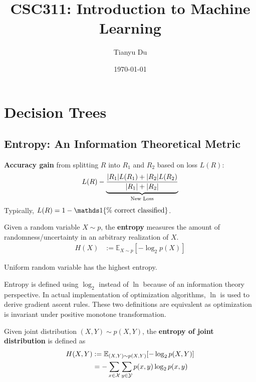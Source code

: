 \documentclass{article}
\title{CSC311: Introduction to Machine Learning}
\date{\today}
\author{Tianyu Du}
\begin{document}
	\maketitle
	\tableofcontents
	\newpage
	
	\section{Decision Trees}
	\subsection{Entropy: An Information Theoretical Metric}
	\begin{definition}
		\textbf{Accuracy gain} from splitting $R$ into $R_1$ and $R_2$ based on loss $L(R)$:
		\begin{align}
			L(R) - \underbrace{\frac{|R_1|L(R_1) + |R_2|L(R_2)}{|R_1| + |R_2|}}_{\text{{New Loss}}}
		\end{align}
		Typically, $L(R) = 1 - \id{\tx{\% correct classified}}$.
	\end{definition}
	
	\begin{definition}
		Given a random variable $X \sim p$, the \textbf{entropy} measures the amount of randomness/uncertainty in an arbitrary realization of $X$. 
		\begin{align}
			H(X) &:= \mathbb{E}_{X \sim p}[- \log_2 p(X)]
		\end{align}
	\end{definition}
	
	\begin{proposition}
		Uniform random variable has the highest entropy.
	\end{proposition}
	
	\begin{remark}
		Entropy is defined using $\log_2$ instead of $\ln$ because of an information theory perspective. In actual implementation of optimization algorithms, $\ln$ is used to derive gradient ascent rules. These two definitions are equivalent as optimization is invariant under positive monotone transformation.
	\end{remark}
	
	\begin{definition}
		Given joint distribution $(X, Y) \sim p(X, Y)$, the \textbf{entropy of joint distribution} is defined as
		\begin{align}
			H(X, Y) &:= \mathbb{E}_{(X, Y) \sim p(X, Y)} [
			- \log_2 p(X, Y)
			] \\
			&= - \sum_{x \in \mathcal{{X}}} \sum_{y \in \mathcal{{Y}}} p(x, y) \log_2 p(x, y)
		\end{align}
	\end{definition}
	
\end{document}
